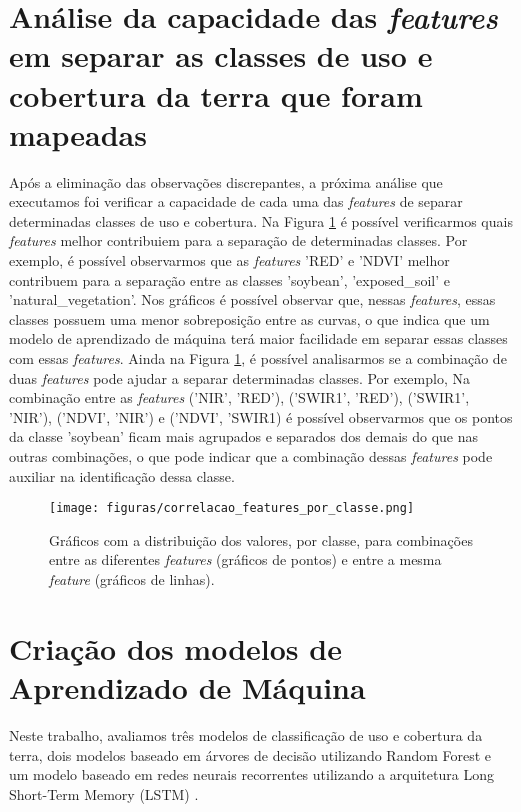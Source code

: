 \section{Análise da capacidade das \textit{features} em separar as classes de uso e cobertura da terra que foram mapeadas}

Após a eliminação das observações discrepantes, a próxima análise que executamos foi verificar a capacidade de cada uma das \textit{features} de separar determinadas classes de uso e cobertura. Na Figura \ref{fig:analise_confusao_entre_classes_por_feature} é possível verificarmos quais \textit{features} melhor contribuiem para a separação de determinadas classes. Por exemplo, é possível observarmos que as \textit{features} 'RED' e 'NDVI' melhor contribuem para a separação entre as classes 'soybean', 'exposed\_soil' e 'natural\_vegetation'. Nos gráficos é possível observar que, nessas \textit{features}, essas classes possuem uma menor sobreposição entre as curvas, o que indica que um modelo de aprendizado de máquina terá maior facilidade em separar essas classes com essas \textit{features}. Ainda na Figura \ref{fig:analise_confusao_entre_classes_por_feature}, é possível analisarmos se a combinação de duas \textit{features} pode ajudar a separar determinadas classes. Por exemplo, Na combinação entre as \textit{features} ('NIR', 'RED'), ('SWIR1', 'RED'), ('SWIR1', 'NIR'), ('NDVI', 'NIR') e ('NDVI', 'SWIR1) é possível observarmos que os pontos da classe 'soybean' ficam mais agrupados e separados dos demais do que nas outras combinações, o que pode indicar que a combinação dessas \textit{features} pode auxiliar na identificação dessa classe. 

\begin{figure}[H]
\caption{Gráficos com a distribuição dos valores, por classe, para combinações entre as diferentes \textit{features} (gráficos de pontos) e entre a mesma \textit{feature} (gráficos de linhas).}
\label{fig:analise_confusao_entre_classes_por_feature}
\centering
\texttt{[image: figuras/correlacao\_features\_por\_classe.png]}
\end{figure}

\section{Criação dos modelos de Aprendizado de Máquina}

Neste trabalho, avaliamos três modelos de classificação de uso e cobertura da terra, dois modelos baseado em árvores de decisão utilizando Random Forest \cite{breiman2001random} e um modelo baseado em redes neurais recorrentes utilizando a arquitetura Long Short-Term Memory (LSTM) \cite{hochreiter1997long}.


